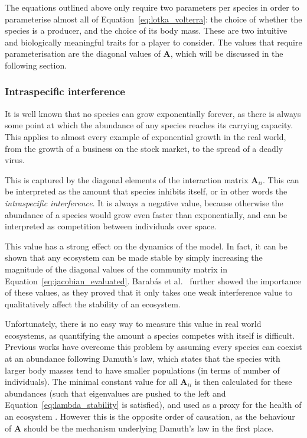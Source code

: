 The equations outlined above only require two parameters per species in order to parameterise almost all of Equation~\eqref{eq:lotka_volterra}: the choice of whether the species is a producer, and the choice of its body mass. These are two intuitive and biologically meaningful traits for a player to consider.
The values that require parameterisation are the diagonal values of $\mathbf{A}$, which will be discussed in the following section.

\subsubsection{Intraspecific interference}
It is well known that no species can grow exponentially forever, as there is always some point at which the abundance of any species reaches its carrying capacity. 
This applies to almost every example of exponential growth in the real world, from the growth of a business on the stock market, to the spread of a deadly virus.

This is captured by the diagonal elements of the interaction matrix $\mathbf{A}_{ii}$. This can be interpreted as the amount that species inhibits itself, or in other words the \emph{intraspecific interference}. It is always a negative value, because otherwise the abundance of a species would grow even faster than exponentially, and can be interpreted as competition between individuals over space.

This value has a strong effect on the dynamics of the model. In fact, it can be shown that any ecosystem can be made stable by simply increasing the magnitude of the diagonal values of the community matrix in Equation~\eqref{eq:jacobian_evaluated}. 
Barab\'as et al.\ \cite{Barabas2017} further showed the importance of these values, as they proved that it only takes one weak interference value to qualitatively affect the stability of an ecosystem.

Unfortunately, there is no easy way to measure this value in real world ecosystems, as quantifying the amount a species competes with itself is difficult. Previous works have overcome this problem by assuming every species can coexist at an abundance following Damuth's law, which states that the species with larger body masses tend to have smaller populations (in terms of number of individuals). The minimal constant value for all $\mathbf{A}_{ii}$ is then calculated for these abundances (such that eigenvalues are pushed to the left and Equation~\eqref{eq:lambda_stability} is satisfied), and used as a proxy for the health of an ecosystem \cite{Tang2014Correlation, Pawar2015}. However this is the opposite order of causation, as the behaviour of $\mathbf{A}$ should be the mechanism underlying Damuth's law in the first place.

